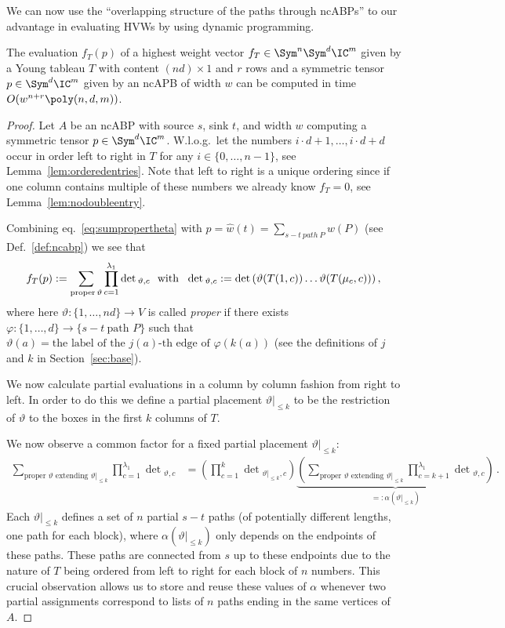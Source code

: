 We can now use the ``overlapping structure of the paths through ncABPs'' to our advantage in evaluating HVWs by using dynamic programming.
\begin{theorem}
    \label{thm:evalabp}
    The evaluation $f_T(p)$ of a highest weight vector $f_T \in \Sym^n\Sym^d \IC^m$ given by a Young tableau $T$ with content $(nd) \times 1$ and $r$ rows and a symmetric tensor $p \in \Sym^d\IC^m$ given by an ncAPB of width $w$ can be computed in time $O(w^{n + r}\poly(n,d,m))$.
\end{theorem}
\begin{proof}
Let $A$ be an ncABP with source $s$, sink $t$, and width $w$ computing a symmetric tensor $p \in \Sym^d \IC^m$.
W.l.o.g.\ let the numbers $i \cdot d + 1, \ldots, i \cdot d + d$ occur in order left to right in $T$ for any $i \in \{0, \ldots, n-1\}$, see Lemma~\ref{lem:orderedentries}.
%
Note that left to right is a unique ordering since if one column contains multiple of these numbers we already know $f_T = 0$, see Lemma~\ref{lem:nodoubleentry}.

Combining eq.~\eqref{eq:sumpropertheta} with
$
    p = \hat{w}(t) = \sum_{s-t\ path\ P}w(P)
$ (see Def.~\ref{def:ncabp})
we see that
\begin{equation}\label{eq:sumproperthetapaths}
    f_T(p)
    := \sum_{\text{proper\,}\vartheta} \prod_{c = 1}^{\lambda_1}\det{}_{\vartheta, c} \ \text{ with } \ \det{}_{\vartheta, c} := \det\left(\vartheta(T(1, c)) \dots \vartheta(T(\mu_c, c))\right),
\end{equation}
where here $\vartheta:\{1,\ldots,nd\}\to V$ is called \emph{proper} if there exists $\varphi:\{1,\ldots,d\}\to\{s-t\  \text{path } P\}$ such that $\vartheta(a)=\text{the label of the $j(a)$-th edge of } \varphi(k(a))$ (see the definitions of $j$ and $k$ in Section~\ref{sec:base}).

We now calculate partial evaluations in a column by column fashion from right to left.
In order to do this we define a partial placement $\vartheta|_{\leq k}$ to be the restriction of $\vartheta$ to the boxes in the first $k$ columns of $T$.

We now observe a common factor for a fixed partial placement $\vartheta|_{\leq k}$:
\begin{align*}
    \sum_{\text{proper $\vartheta$ extending $\vartheta|_{\leq k}$}}\prod_{c = 1}^{\lambda_1}\det{}_{\vartheta,c}
    &=
    \left(\prod_{c = 1}^{k}\det{}_{\vartheta|_{\leq k},c}\right) \underbrace{\left(\sum_{\text{proper $\vartheta$ extending $\vartheta|_{\leq k}$}}\prod_{c = k+1}^{\lambda_1}\det{}_{\vartheta,c}\right)}_{=:\alpha(\vartheta|_{\leq k})}\,.
\end{align*}
Each $\vartheta|_{\leq k}$ defines a set of $n$ partial $s-t$ paths (of potentially different lengths, one path for each block), where $\alpha(\vartheta|_{\leq k})$ only depends on the endpoints of these paths.
These paths are connected from $s$ up to these endpoints due to the nature of $T$ being ordered from left to right for each block of $n$ numbers.
This crucial observation allows us to store and reuse these values of $\alpha$ whenever two partial assignments correspond to lists of $n$ paths ending in the same vertices of $A$.


\end{proof}
